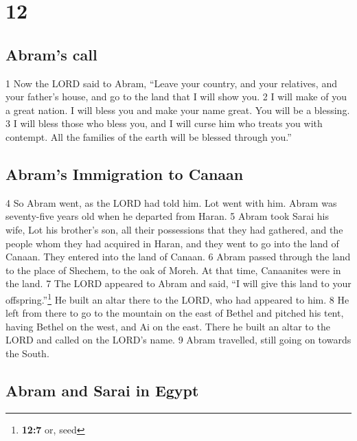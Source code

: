 \hypertarget{section-11}{%
\section{12}\label{section-11}}

\hypertarget{abrams-call}{%
\subsection{Abram's call}\label{abrams-call}}

{1} Now the LORD said to Abram, ``Leave your country, and your
relatives, and your father's house, and go to the land that I will show
you. {2} I will make of you a great nation. I will bless you and make
your name great. You will be a blessing. {3} I will bless those who
bless you, and I will curse him who treats you with contempt. All the
families of the earth will be blessed through you.''

\hypertarget{abrams-immigration-to-canaan}{%
\subsection{Abram's Immigration to
Canaan}\label{abrams-immigration-to-canaan}}

{4} So Abram went, as the LORD had told him. Lot went with him. Abram
was seventy-five years old when he departed from Haran. {5} Abram took
Sarai his wife, Lot his brother's son, all their possessions that they
had gathered, and the people whom they had acquired in Haran, and they
went to go into the land of Canaan. They entered into the land of
Canaan. {6} Abram passed through the land to the place of Shechem, to
the oak of Moreh. At that time, Canaanites were in the land. {7} The
LORD appeared to Abram and said, ``I will give this land to your
offspring.''\footnote{\textbf{12:7} or, seed} He built an altar there to
the LORD, who had appeared to him. {8} He left from there to go to the
mountain on the east of Bethel and pitched his tent, having Bethel on
the west, and Ai on the east. There he built an altar to the LORD and
called on the LORD's name. {9} Abram travelled, still going on towards
the South.

\hypertarget{abram-and-sarai-in-egypt}{%
\subsection{Abram and Sarai in Egypt}\label{abram-and-sarai-in-egypt}}

